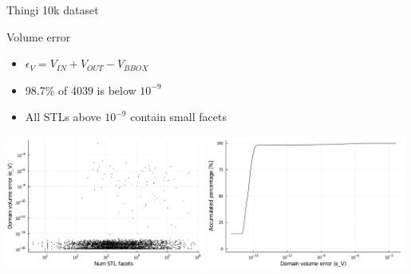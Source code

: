 \documentclass{beamer}
\begin{document}
\begin{frame}{Thingi 10k dataset}

  \begin{block}{Volume error}
  \begin{itemize}
    \item
      $\epsilon_V = V_{IN} + V_{OUT} - V_{BBOX}$
    \item
      98.7\% of 4039 is below $10^{-9}$
    \item
      All STLs above $10^{-9}$ contain small facets
  \end{itemize}
  \end{block}

  \includegraphics[width=0.49\textwidth]{../analysis/plots/num_stl_facets_volume_error}
  \includegraphics[width=0.49\textwidth]{../analysis/plots/histogram_volume_error}
\end{frame}
\end{document}
